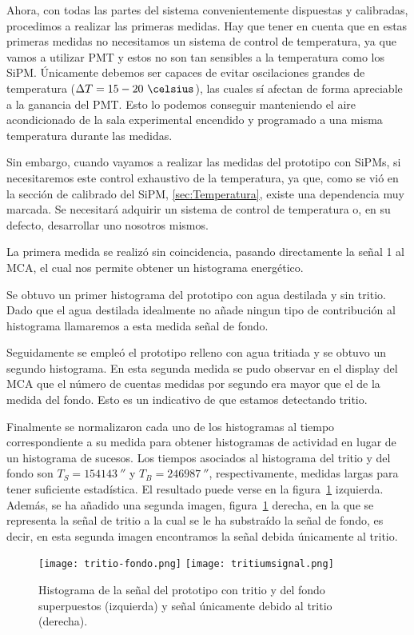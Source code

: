 Ahora, con todas las partes del sistema convenientemente dispuestas y calibradas, procedimos a realizar las primeras medidas. Hay que tener en cuenta que en estas primeras medidas no necesitamos un sistema de control de temperatura, ya que vamos a utilizar PMT y estos no son tan sensibles a la temperatura como los SiPM. Únicamente debemos ser capaces de evitar oscilaciones grandes de temperatura ($\Delta T=15-20~\celsius$), las cuales sí afectan de forma apreciable a la ganancia del PMT. Esto lo podemos conseguir manteniendo el aire acondicionado de la sala experimental encendido y programado a una misma temperatura durante las medidas. 

Sin embargo, cuando vayamos a realizar las medidas del prototipo con SiPMs, si necesitaremos este control exhaustivo de la temperatura, ya que, como se vió en la sección de calibrado del SiPM, \ref{sec:Temperatura}, existe una dependencia muy marcada. Se necesitará adquirir un sistema de control de temperatura o, en su defecto, desarrollar uno nosotros mismos.

La primera medida se realizó sin coincidencia, pasando directamente la señal 1 al MCA, el cual nos permite obtener un histograma energético.

Se obtuvo un primer histograma del prototipo con agua destilada y sin tritio. Dado que el agua destilada idealmente no añade ningun tipo de contribución al histograma llamaremos a esta medida señal de fondo. 

Seguidamente se empleó el prototipo relleno con agua tritiada y se obtuvo un segundo histograma. En esta segunda medida se pudo observar en el display del MCA que el número de cuentas medidas por segundo era mayor que el de la medida del fondo. Esto es un indicativo de que estamos detectando tritio. 

Finalmente se normalizaron cada uno de los histogramas al tiempo correspondiente a su medida para obtener histogramas de actividad en lugar de un histograma de sucesos. Los tiempos asociados al histograma del tritio y del fondo son $T_S=154143~\second$  y $T_B=246987~\second$, respectivamente, medidas largas para tener suficiente estadística. El resultado puede verse en la figura~\ref{senaltritio} izquierda. Además, se ha añadido una segunda imagen, figura~\ref{senaltritio} derecha,  en la que se representa la señal de tritio a la cual se le ha substraído la señal de fondo, es decir, en esta segunda imagen encontramos la señal debida únicamente al tritio.

\begin{figure}[htb]
\centering
{
\texttt{[image: tritio-fondo.png]} 
}
{
\texttt{[image: tritiumsignal.png]} 
}
\caption{Histograma de la señal del prototipo con tritio y del fondo superpuestos (izquierda) y señal únicamente debido al tritio (derecha).\label{senaltritio}}
\end{figure}


